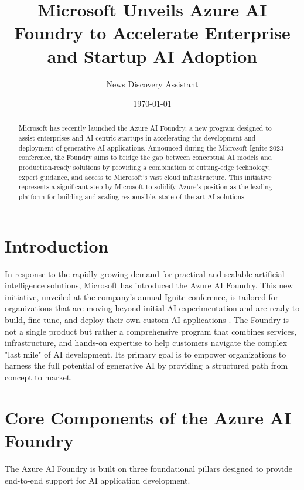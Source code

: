 \documentclass[12pt, a4paper]{article}
\title{\textbf{Microsoft Unveils Azure AI Foundry to Accelerate Enterprise and Startup AI Adoption}}
\author{News Discovery Assistant}
\date{\today}
\begin{document}
\maketitle

\begin{abstract}
\noindent Microsoft has recently launched the Azure AI Foundry, a new program designed to assist enterprises and AI-centric startups in accelerating the development and deployment of generative AI applications. Announced during the Microsoft Ignite 2023 conference, the Foundry aims to bridge the gap between conceptual AI models and production-ready solutions by providing a combination of cutting-edge technology, expert guidance, and access to Microsoft's vast cloud infrastructure. This initiative represents a significant step by Microsoft to solidify Azure's position as the leading platform for building and scaling responsible, state-of-the-art AI solutions.
\end{abstract}

\section{Introduction}
In response to the rapidly growing demand for practical and scalable artificial intelligence solutions, Microsoft has introduced the Azure AI Foundry. This new initiative, unveiled at the company's annual Ignite conference, is tailored for organizations that are moving beyond initial AI experimentation and are ready to build, fine-tune, and deploy their own custom AI applications \cite{MicrosoftIgnite2023}. The Foundry is not a single product but rather a comprehensive program that combines services, infrastructure, and hands-on expertise to help customers navigate the complex "last mile" of AI development. Its primary goal is to empower organizations to harness the full potential of generative AI by providing a structured path from concept to market.

\section{Core Components of the Azure AI Foundry}
The Azure AI Foundry is built on three foundational pillars designed to provide end-to-end support for AI application development.
\end{document}
